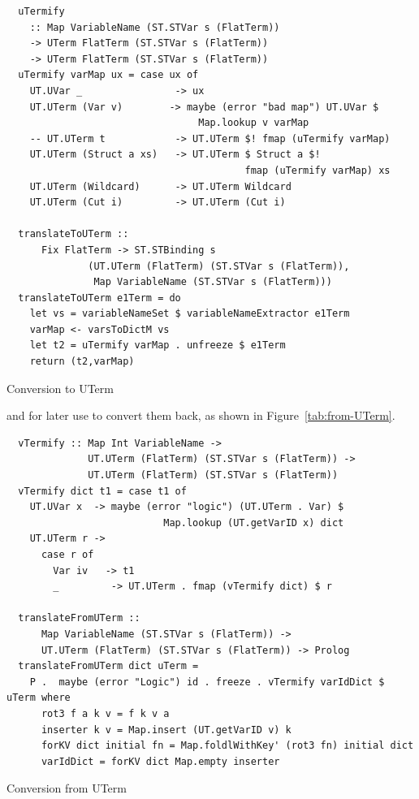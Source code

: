 \documentclass[thesis-solanki.tex]{subfiles}
\begin{document}
\begin{code-list}
  \begin{verbatim}
  uTermify
    :: Map VariableName (ST.STVar s (FlatTerm))
    -> UTerm FlatTerm (ST.STVar s (FlatTerm))
    -> UTerm FlatTerm (ST.STVar s (FlatTerm))
  uTermify varMap ux = case ux of
    UT.UVar _                -> ux
    UT.UTerm (Var v)        -> maybe (error "bad map") UT.UVar $
                                 Map.lookup v varMap
    -- UT.UTerm t            -> UT.UTerm $! fmap (uTermify varMap)
    UT.UTerm (Struct a xs)   -> UT.UTerm $ Struct a $!
                                         fmap (uTermify varMap) xs
    UT.UTerm (Wildcard)      -> UT.UTerm Wildcard
    UT.UTerm (Cut i)         -> UT.UTerm (Cut i)

  translateToUTerm ::
      Fix FlatTerm -> ST.STBinding s
              (UT.UTerm (FlatTerm) (ST.STVar s (FlatTerm)),
               Map VariableName (ST.STVar s (FlatTerm)))
  translateToUTerm e1Term = do
    let vs = variableNameSet $ variableNameExtractor e1Term
    varMap <- varsToDictM vs
    let t2 = uTermify varMap . unfreeze $ e1Term
    return (t2,varMap)
  \end{verbatim}
  \caption{Conversion to UTerm}
  \label{tab:to-UTerm}
\end{code-list}
%
and for later use to convert them back, as shown in Figure~\ref{tab:from-UTerm}.
%
\begin{code-list}
  \begin{verbatim}
  vTermify :: Map Int VariableName ->
              UT.UTerm (FlatTerm) (ST.STVar s (FlatTerm)) ->
              UT.UTerm (FlatTerm) (ST.STVar s (FlatTerm))
  vTermify dict t1 = case t1 of
    UT.UVar x  -> maybe (error "logic") (UT.UTerm . Var) $
                           Map.lookup (UT.getVarID x) dict
    UT.UTerm r ->
      case r of
        Var iv   -> t1
        _         -> UT.UTerm . fmap (vTermify dict) $ r

  translateFromUTerm ::
      Map VariableName (ST.STVar s (FlatTerm)) ->
      UT.UTerm (FlatTerm) (ST.STVar s (FlatTerm)) -> Prolog
  translateFromUTerm dict uTerm =
    P .  maybe (error "Logic") id . freeze . vTermify varIdDict $ uTerm where
      rot3 f a k v = f k v a
      inserter k v = Map.insert (UT.getVarID v) k
      forKV dict initial fn = Map.foldlWithKey' (rot3 fn) initial dict
      varIdDict = forKV dict Map.empty inserter
  \end{verbatim}
  \caption{Conversion from UTerm}
  \label{tab:from-UTerm}
\end{code-list}
\end{document}
